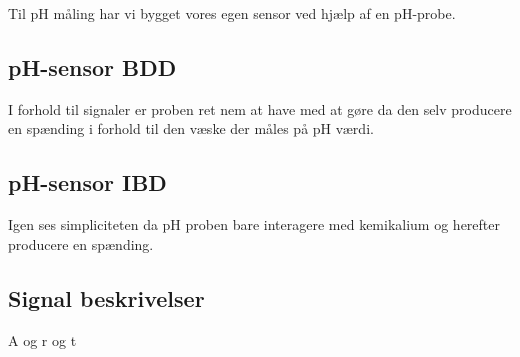
Til pH måling har vi bygget vores egen sensor ved hjælp af en pH-probe.

\subsection{pH-sensor BDD}
I forhold til signaler er proben ret nem at have med at gøre da den selv producere en spænding i forhold til den væske der måles på pH værdi.


\subsection{pH-sensor IBD}
Igen ses simpliciteten da pH proben bare interagere med kemikalium og herefter producere en spænding.


\subsection{Signal beskrivelser}

\newcommand{\kalle}[3][A]{
#1 og #2 og #3
}

\kalle{r}{t}